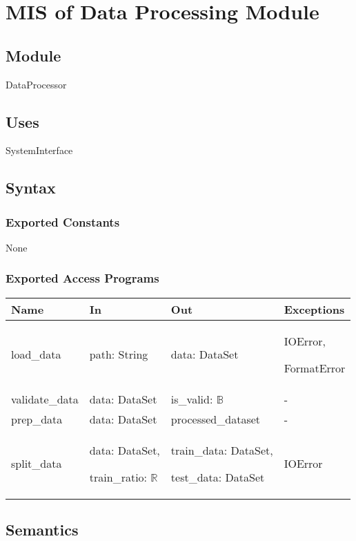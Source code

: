 \documentclass[12pt, titlepage]{article}
\begin{document}
\section{MIS of Data Processing Module} \label{ModuleDP}

\subsection{Module}

DataProcessor

\subsection{Uses}
SystemInterface

\subsection{Syntax}

\subsubsection{Exported Constants}
None
\subsubsection{Exported Access Programs}

\begin{center}
\begin{tabular}{p{2cm} p{4cm} p{4cm} p{2cm}}
\hline
\textbf{Name} & \textbf{In} & \textbf{Out} & \textbf{Exceptions} \\
\hline
load\_data & path: String & data: DataSet & IOError,

FormatError\\
\hline
validate\_data & data: DataSet & is\_valid: $\mathbb{B}$ & -\\
\hline
prep\_data & data: DataSet & processed\_dataset & - \\
\hline
split\_data & data: DataSet,

train\_ratio: $\mathbb{R}$ & train\_data: DataSet,

test\_data: DataSet & IOError \\
\hline
\end{tabular}
\end{center}

\subsection{Semantics}
\end{document}
